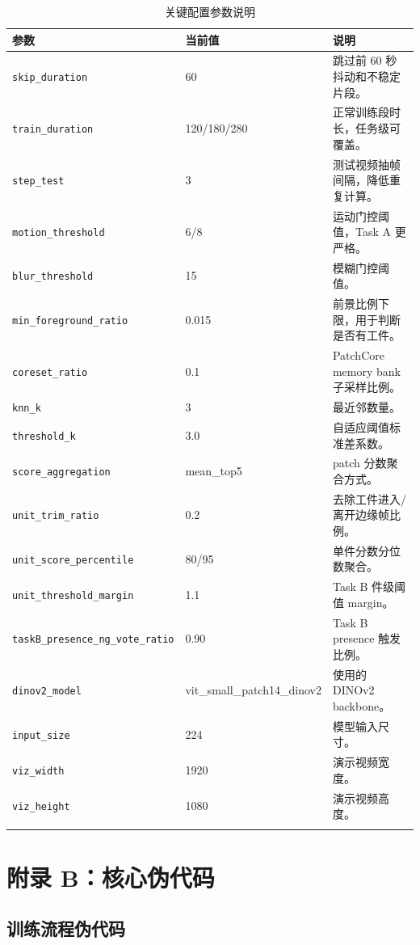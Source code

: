 \documentclass[12pt,hyperref,a4paper,UTF8,fontset=fandol]{ctexart}
\begin{document}
\begin{longtable}{p{}p{}p{}}
\toprule
参数 & 当前值 & 说明 \\
\midrule
\texttt{skip\_duration} & 60 & 跳过前 60 秒抖动和不稳定片段。 \\
\texttt{train\_duration} & 120/180/280 & 正常训练段时长，任务级可覆盖。 \\
\texttt{step\_test} & 3 & 测试视频抽帧间隔，降低重复计算。 \\
\texttt{motion\_threshold} & 6/8 & 运动门控阈值，Task A 更严格。 \\
\texttt{blur\_threshold} & 15 & 模糊门控阈值。 \\
\texttt{min\_foreground\_ratio} & 0.015 & 前景比例下限，用于判断是否有工件。 \\
\texttt{coreset\_ratio} & 0.1 & PatchCore memory bank 子采样比例。 \\
\texttt{knn\_k} & 3 & 最近邻数量。 \\
\texttt{threshold\_k} & 3.0 & 自适应阈值标准差系数。 \\
\texttt{score\_aggregation} & mean\_top5 & patch 分数聚合方式。 \\
\texttt{unit\_trim\_ratio} & 0.2 & 去除工件进入/离开边缘帧比例。 \\
\texttt{unit\_score\_percentile} & 80/95 & 单件分数分位数聚合。 \\
\texttt{unit\_threshold\_margin} & 1.1 & Task B 件级阈值 margin。 \\
\texttt{taskB\_presence\_ng\_vote\_ratio} & 0.90 & Task B presence 触发比例。 \\
\texttt{dinov2\_model} & vit\_small\_patch14\_dinov2 & 使用的 DINOv2 backbone。 \\
\texttt{input\_size} & 224 & 模型输入尺寸。 \\
\texttt{viz\_width} & 1920 & 演示视频宽度。 \\
\texttt{viz\_height} & 1080 & 演示视频高度。 \\
\bottomrule
\caption{关键配置参数说明}
\end{longtable}

\newpage
\section{附录 B：核心伪代码}

\subsection{训练流程伪代码}
\end{document}
